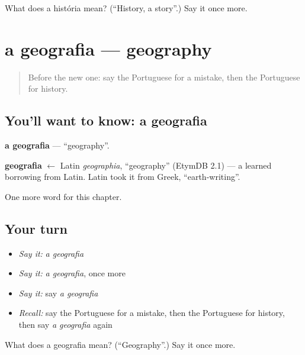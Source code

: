\begin{tcolorbox}[breakable,colback=teal!4,colframe=teal!35!black,title={Before you move on}]
What does a história mean? (\textquotedblleft{}History, a story\textquotedblright{}.) Say it once more.
\end{tcolorbox}
\section[a geografia]{a geografia — geography}

\label{lesson:PT-C230-geografia}



\begin{quote}
Before the new one: say the Portuguese for a mistake, then the Portuguese for history.
\end{quote}

\subsection*{You'll want to know: a geografia}
\textbf{a geografia} — \textquotedblleft{}geography\textquotedblright{}.

\begin{cousinweb}
\textbf{geografia} $\leftarrow$ Latin \emph{geographia}, \textquotedblleft{}geography\textquotedblright{} (EtymDB 2.1) — a learned borrowing from Latin. Latin took it from Greek, \textquotedblleft{}earth-writing\textquotedblright{}.
\end{cousinweb}

\begin{grammarlens}[title={What you've built}]
One more word for this chapter.
\end{grammarlens}

\subsection*{Your turn}
\begin{itemize}
\raggedright
  \item \emph{Say it:} \emph{a geografia}
  \item \emph{Say it:} \emph{a geografia}, once more
  \item \emph{Say it:} say \emph{a geografia}
  \item \emph{Recall:} say the Portuguese for a mistake, then the Portuguese for history, then say \emph{a geografia} again
\end{itemize}

\begin{tcolorbox}[breakable,colback=teal!4,colframe=teal!35!black,title={Before you move on}]
What does a geografia mean? (\textquotedblleft{}Geography\textquotedblright{}.) Say it once more.
\end{tcolorbox}
